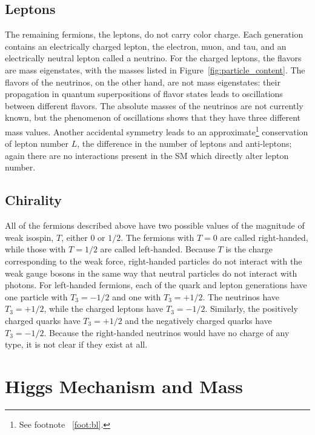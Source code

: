 \subsection{Leptons}

The remaining fermions, the leptons, do not carry color charge.
Each generation contains an electrically charged lepton, the electron, muon, and tau, and an electrically neutral lepton called a neutrino.
For the charged leptons, the flavors are mass eigenstates, with the masses listed in Figure~\ref{fig:particle_content}.
The flavors of the neutrinos, on the other hand, are not mass eigenstates: their propagation in quantum superpositions of flavor states leads to oscillations between different flavors.
The absolute masses of the neutrinos are not currently known, but the phenomenon of oscillations shows that they have three different mass values.
Another accidental symmetry leads to an approximate\footnote{See footnote ~\ref{foot:bl}.} conservation of lepton number $L$, the difference in the number of leptons and anti-leptons; again there are no interactions present in the \ac{SM} which directly alter lepton number.

\subsection{Chirality}

All of the fermions described above have two possible values of the magnitude of weak isospin, $T$, either $0$ or $1/2$.
The fermions with $T = 0$ are called right-handed, while those with $T=1/2$ are called left-handed.
Because $T$ is the charge corresponding to the weak force, right-handed particles do not interact with the weak gauge bosons in the same way that neutral particles do not interact with photons.
For left-handed fermions, each of the quark and lepton generations have one particle with $T_3 = -1/2$ and one with $T_3 = +1/2$.
The neutrinos have $T_3 = +1/2$, while the charged leptons have $T_3 = -1/2$.
Similarly, the positively charged quarks have $T_3 = +1/2$ and the negatively charged quarks have $T_3 = -1/2$.
Because the right-handed neutrinos would have no charge of any type, it is not clear if they exist at all.


\section{Higgs Mechanism and Mass}

